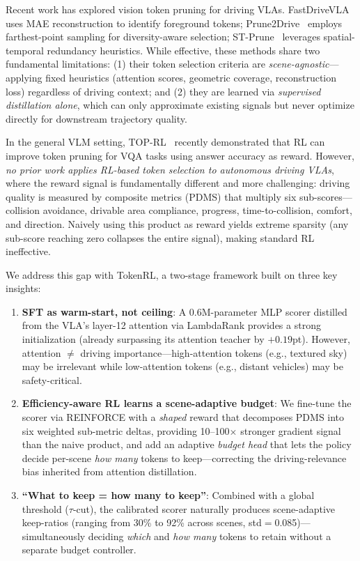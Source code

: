 \documentclass[letterpaper]{article} %
\newcommand{\ours}{TokenRL}
\begin{document}
Recent work has explored vision token pruning for driving VLAs.
FastDriveVLA~\citep{fastdrivevla2026} uses MAE reconstruction to identify foreground tokens;
Prune2Drive~\citep{prune2drive2026} employs farthest-point sampling for diversity-aware selection;
ST-Prune~\citep{stprune2026} leverages spatial-temporal redundancy heuristics.
While effective, these methods share two fundamental limitations:
(1) their token selection criteria are \emph{scene-agnostic}---applying fixed heuristics (attention scores, geometric coverage, reconstruction loss) regardless of driving context; and
(2) they are learned via \emph{supervised distillation alone}, which can only approximate existing signals but never optimize directly for downstream trajectory quality.

In the general VLM setting, TOP-RL~\citep{toprl2026} recently demonstrated that RL can improve token pruning for VQA tasks using answer accuracy as reward.
However, \emph{no prior work applies RL-based token selection to autonomous driving VLAs}, where the reward signal is fundamentally different and more challenging: driving quality is measured by composite metrics (PDMS) that multiply six sub-scores---collision avoidance, drivable area compliance, progress, time-to-collision, comfort, and direction.
Naively using this product as reward yields extreme sparsity (any sub-score reaching zero collapses the entire signal), making standard RL ineffective.

We address this gap with \ours{}, a two-stage framework built on three key insights:
\begin{enumerate}[nosep,leftmargin=*]
\item \textbf{SFT as warm-start, not ceiling}: A 0.6M-parameter MLP scorer distilled from the VLA's layer-12 attention via LambdaRank provides a strong initialization (already surpassing its attention teacher by $+0.19$pt). However, attention $\neq$ driving importance---high-attention tokens (e.g., textured sky) may be irrelevant while low-attention tokens (e.g., distant vehicles) may be safety-critical.
\item \textbf{Efficiency-aware RL learns a scene-adaptive budget}: We fine-tune the scorer via REINFORCE with a \emph{shaped} reward that decomposes PDMS into six weighted sub-metric deltas, providing 10--100$\times$ stronger gradient signal than the naive product, and add an adaptive \emph{budget head} that lets the policy decide per-scene \emph{how many} tokens to keep---correcting the driving-relevance bias inherited from attention distillation.
\item \textbf{``What to keep = how many to keep''}: Combined with a global threshold ($\tau$-cut), the calibrated scorer naturally produces scene-adaptive keep-ratios (ranging from 30\% to 92\% across scenes, std$=$0.085)---simultaneously deciding \emph{which} and \emph{how many} tokens to retain without a separate budget controller.
\end{enumerate}
\end{document}
